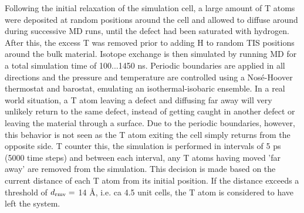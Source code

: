 Following the initial relaxation of the simulation cell, a large amount of T atoms were deposited at random positions around the cell and allowed to diffuse around during successive MD runs, until the defect had been saturated with hydrogen.
After this, the excess T was removed prior to adding H to random TIS positions around the bulk material. 
Isotope exchange is then simulated by running MD for a total simulation time of 100...1450 ns. 
Periodic boundaries are applied in all directions and the pressure and temperature are controlled using a Nos\'{e}-Hoover thermostat and barostat, emulating an isothermal-isobaric ensemble. 
In a real world situation, a T atom leaving a defect and diffusing far away will very unlikely return to the same defect, instead of getting caught in another defect or leaving the material through a surface. 
Due to the periodic boundaries, however, this behavior is not seen as the T atom exiting the cell simply returns from the opposite side. 
T counter this, the simulation is performed in intervals of 5 ps (5000 time steps) and between each interval, any T atoms having moved 'far away' are removed from the simulation. 
This decision is made based on the current distance of each T atom from its initial position. 
If the distance exceeds a threshold of $d_{\rm{rmv}} =$ 14 \AA, i.e. ca 4.5 unit cells, the T atom is considered to have left the system. 




